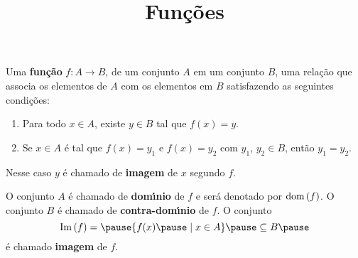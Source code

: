 \documentclass{beamer}
\title{Fun\c{c}\~oes}
\author[\autor]{\autor}
\institute[\instituto]{\instituto}
\date{}
\begin{document}
    \begin{frame}
        \maketitle
    \end{frame}


    \begin{frame}
        \begin{definicao}
            Uma \textbf{fun{\c c}{\~a}o} \pause $f : A \to B$, \pause de um conjunto $A$ \pause em um conjunto $B$,
             uma rela{\c c}{\~a}o que associa os elementos de $A$ \pause com os elementos em $B$ \pause
            satisfazendo as seguintes condi\c{c}\~oes:\pause
            \begin{enumerate}[label={\roman*})]
                \item Para todo $x \in A$, \pause existe $y \in B$ \pause tal que $f(x) = y$.\pause

                \vspace{.3cm}

                \item  Se $x \in A$ \pause \'e tal que $f(x) = y_1$ \pause e $f(x) = y_2$ \pause com $y_1$, \pause $y_2 \in B$, \pause ent\~ao $y_1 = y_2$.\pause
            \end{enumerate}
            Nesse caso $y$ \'e chamado de \textbf{imagem} \pause de $x$ segundo $f$.\pause
        \end{definicao}

        O conjunto $A$ {\'e} chamado de \textbf{dom{\'\i}nio} \pause de $f$ \pause e ser\'a denotado por ${\rm dom\,}(f)$. \pause O conjunto $B$ {\'e} chamado de \textbf{contra-dom{\'\i}nio} \pause de $f$. \pause O conjunto\pause
        \[
            \im(f) = \pause \{f(x) \pause \mid x \in A\} \pause \sub B\pause
        \]
        \'e chamado \textbf{imagem} de $f$.
    \end{frame}
\end{document}

